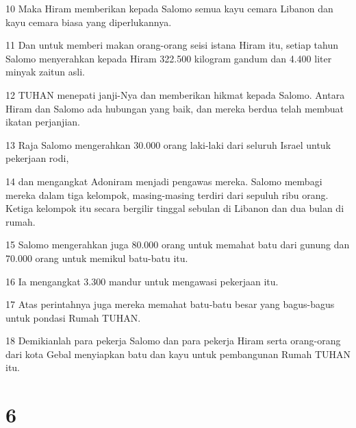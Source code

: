 \par 10 Maka Hiram memberikan kepada Salomo semua kayu cemara Libanon dan kayu cemara biasa yang diperlukannya.
\par 11 Dan untuk memberi makan orang-orang seisi istana Hiram itu, setiap tahun Salomo menyerahkan kepada Hiram 322.500 kilogram gandum dan 4.400 liter minyak zaitun asli.
\par 12 TUHAN menepati janji-Nya dan memberikan hikmat kepada Salomo. Antara Hiram dan Salomo ada hubungan yang baik, dan mereka berdua telah membuat ikatan perjanjian.
\par 13 Raja Salomo mengerahkan 30.000 orang laki-laki dari seluruh Israel untuk pekerjaan rodi,
\par 14 dan mengangkat Adoniram menjadi pengawas mereka. Salomo membagi mereka dalam tiga kelompok, masing-masing terdiri dari sepuluh ribu orang. Ketiga kelompok itu secara bergilir tinggal sebulan di Libanon dan dua bulan di rumah.
\par 15 Salomo mengerahkan juga 80.000 orang untuk memahat batu dari gunung dan 70.000 orang untuk memikul batu-batu itu.
\par 16 Ia mengangkat 3.300 mandur untuk mengawasi pekerjaan itu.
\par 17 Atas perintahnya juga mereka memahat batu-batu besar yang bagus-bagus untuk pondasi Rumah TUHAN.
\par 18 Demikianlah para pekerja Salomo dan para pekerja Hiram serta orang-orang dari kota Gebal menyiapkan batu dan kayu untuk pembangunan Rumah TUHAN itu.

\chapter{6}

